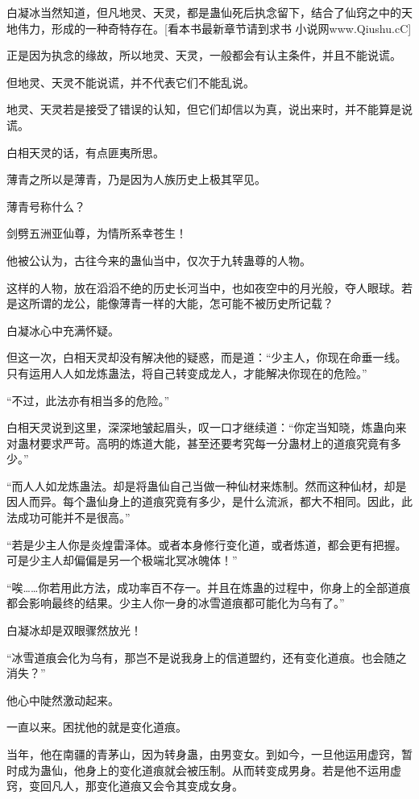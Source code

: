 
\begin{this_body}

白凝冰当然知道，但凡地灵、天灵，都是蛊仙死后执念留下，结合了仙窍之中的天地伟力，形成的一种奇特存在。[看本书最新章节请到求书 小说网www.Qiushu.cC]

正是因为执念的缘故，所以地灵、天灵，一般都会有认主条件，并且不能说谎。

但地灵、天灵不能说谎，并不代表它们不能乱说。

地灵、天灵若是接受了错误的认知，但它们却信以为真，说出来时，并不能算是说谎。

白相天灵的话，有点匪夷所思。

薄青之所以是薄青，乃是因为人族历史上极其罕见。

薄青号称什么？

剑劈五洲亚仙尊，为情所系幸苍生！

他被公认为，古往今来的蛊仙当中，仅次于九转蛊尊的人物。

这样的人物，放在滔滔不绝的历史长河当中，也如夜空中的月光般，夺人眼球。若是这所谓的龙公，能像薄青一样的大能，怎可能不被历史所记载？

白凝冰心中充满怀疑。

但这一次，白相天灵却没有解决他的疑惑，而是道：“少主人，你现在命垂一线。只有运用人人如龙炼蛊法，将自己转变成龙人，才能解决你现在的危险。”

“不过，此法亦有相当多的危险。”

白相天灵说到这里，深深地皱起眉头，叹一口才继续道：“你定当知晓，炼蛊向来对蛊材要求严苛。高明的炼道大能，甚至还要考究每一分蛊材上的道痕究竟有多少。”

“而人人如龙炼蛊法。却是将蛊仙自己当做一种仙材来炼制。然而这种仙材，却是因人而异。每个蛊仙身上的道痕究竟有多少，是什么流派，都大不相同。因此，此法成功可能并不是很高。”

“若是少主人你是炎煌雷泽体。或者本身修行变化道，或者炼道，都会更有把握。可是少主人却偏偏是另一个极端北冥冰魄体！”

“唉……你若用此方法，成功率百不存一。并且在炼蛊的过程中，你身上的全部道痕都会影响最终的结果。少主人你一身的冰雪道痕都可能化为乌有了。”

白凝冰却是双眼骤然放光！

“冰雪道痕会化为乌有，那岂不是说我身上的信道盟约，还有变化道痕。也会随之消失？”

他心中陡然激动起来。

一直以来。困扰他的就是变化道痕。

当年，他在南疆的青茅山，因为转身蛊，由男变女。到如今，一旦他运用虚窍，暂时成为蛊仙，他身上的变化道痕就会被压制。从而转变成男身。若是他不运用虚窍，变回凡人，那变化道痕又会令其变成女身。


\end{this_body}
